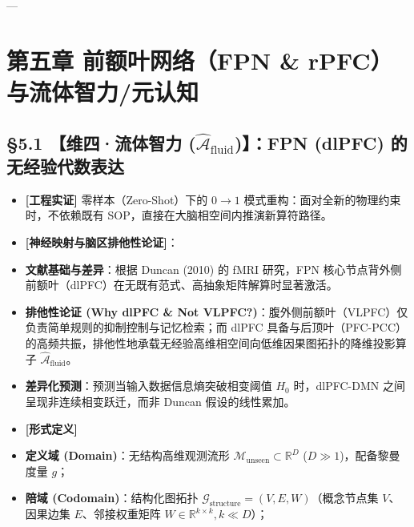 \documentclass[11pt,a4paper,oneside]{ctexart}
\begin{document}
---


\section{第五章 前额叶网络（FPN \& rPFC）与流体智力/元认知}

\subsection{§5.1 【维四·流体智力 (\texorpdfstring{$\hat{\mathcal{A}}_{\text{fluid}}$}{A\_fluid})】：FPN (dlPFC) 的无经验代数表达}

\begin{itemize}\item \textbf{[工程实证]} 零样本（Zero-Shot）下的 $0 \to 1$ 模式重构：面对全新的物理约束时，不依赖既有 SOP，直接在大脑相空间内推演新算符路径。\end{itemize}
\begin{itemize}\item \textbf{[神经映射与脑区排他性论证]}：\end{itemize}
\begin{itemize}\item \textbf{文献基础与差异}：根据 Duncan (2010) 的 fMRI 研究，FPN 核心节点背外侧前额叶（dlPFC）在无既有范式、高抽象矩阵解算时显著激活。\end{itemize}
\begin{itemize}\item \textbf{排他性论证 (Why dlPFC \& Not VLPFC?)}：腹外侧前额叶（VLPFC）仅负责简单规则的抑制控制与记忆检索；而 dlPFC 具备与后顶叶（PFC-PCC）的高频共振，排他性地承载\textit{}无经验高维相空间向低维因果图拓扑的降维投影算子 $\hat{\mathcal{A}}_{\text{fluid}}$\textit{}。\end{itemize}
\begin{itemize}\item \textbf{差异化预测}：预测当输入数据信息熵突破相变阈值 $H_0$ 时，dlPFC-DMN 之间呈现非连续相变跃迁，而非 Duncan 假设的线性累加。\end{itemize}
\begin{itemize}\item \textbf{[形式定义]}\end{itemize}
\begin{itemize}\item \textbf{定义域 (Domain)}：无结构高维观测流形 $\mathcal{M}_{\text{unseen}} \subset \mathbb{R}^D$ ($D \gg 1$)，配备黎曼度量 $g$；\end{itemize}
\begin{itemize}\item \textbf{陪域 (Codomain)}：结构化图拓扑 $\mathcal{G}_{\text{structure}} = (V, E, W)$（概念节点集 $V$、因果边集 $E$、邻接权重矩阵 $W \in \mathbb{R}^{k \times k}, k \ll D$）；\end{itemize}
\end{document}
